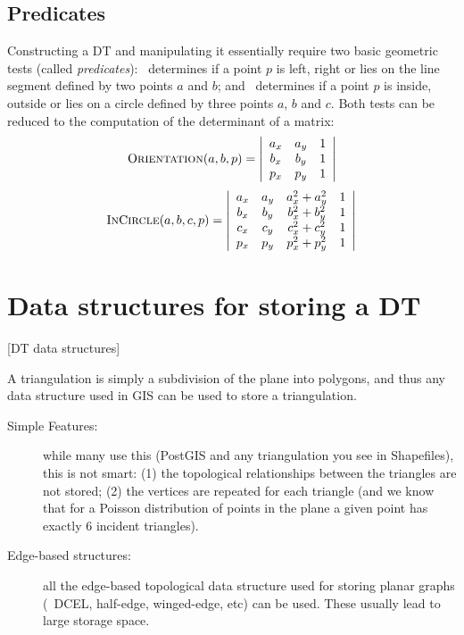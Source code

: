 \subsection{Predicates}%
\label{sec:predicates}
Constructing a DT and manipulating it essentially require two basic geometric tests (called \emph{predicates}): \Orient\ determines if a point $p$ is left, right or lies on the line segment defined by two points $a$ and $b$; and \Incircle\ determines if a point $p$ is inside, outside or lies on a circle defined by three points $a$, $b$ and $c$. 
Both tests can be reduced to the computation of the determinant of a matrix:
\begin{equation}
  \textrm{O}\textsc{rientation}(a, b, p) = 
  \left| 
  \begin{array}{cccc}
    a_{x} & a_{y} & 1 \\
    b_{x} & b_{y} & 1 \\
    p_{x} & p_{y} & 1 
  \end{array} 
  \right| 
\end{equation}
\begin{equation}
  \textrm{I}\textsc{n}\textrm{C}\textsc{ircle}(a, b, c, p) = 
  \left| 
  \begin{array}{ccccc}
    a_{x} & a_{y} & a^{2}_{x} + a^{2}_{y} & 1 \\
    b_{x} & b_{y} & b^{2}_{x} + b^{2}_{y} & 1 \\
    c_{x} & c_{y} & c^{2}_{x} + c^{2}_{y} & 1 \\
    p_{x} & p_{y} & p^{2}_{x} + p^{2}_{y} & 1 
  \end{array} 
  \right|%
\label{eq:insphere}
\end{equation}


\section{Data structures for storing a DT}[DT data structures]

A triangulation is simply a subdivision of the plane into polygons, and thus any data structure used in GIS can be used to store a triangulation.

\begin{description}
  \item[Simple Features:] while many use this (PostGIS and any triangulation you see in Shapefiles), this is not smart: (1) the topological relationships between the triangles are not stored; (2) the vertices are repeated for each triangle (and we know that for a Poisson distribution of points in the plane a given point has exactly 6 incident triangles).
  \item[Edge-based structures:] all the edge-based topological data structure used for storing planar graphs (\eg\ DCEL, half-edge, winged-edge, etc) can be used. These usually lead to large storage space.
\end{description}

